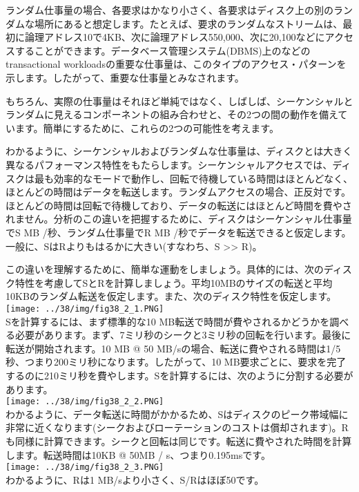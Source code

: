 ランダム仕事量の場合、各要求はかなり小さく、各要求はディスク上の別のランダムな場所にあると想定します。たとえば、要求のランダムなストリームは、最初に論理アドレス10で4KB、次に論理アドレス550,000、次に20,100などにアクセスすることができます。データベース管理システム(DBMS)上のなどのtransactional
workloadsの重要な仕事量は、このタイプのアクセス・パターンを示します。したがって、重要な仕事量とみなされます。

もちろん、実際の仕事量はそれほど単純ではなく、しばしば、シーケンシャルとランダムに見えるコンポーネントの組み合わせと、その2つの間の動作を備えています。簡単にするために、これらの2つの可能性を考えます。

わかるように、シーケンシャルおよびランダムな仕事量は、ディスクとは大きく異なるパフォーマンス特性をもたらします。シーケンシャルアクセスでは、ディスクは最も効率的なモードで動作し、回転で待機している時間はほとんどなく、ほとんどの時間はデータを転送します。ランダムアクセスの場合、正反対です。ほとんどの時間は回転で待機しており、データの転送にはほとんど時間を費やされません。分析のこの違いを把握するために、ディスクはシーケンシャル仕事量でS
MB /秒、ランダム仕事量でR MB
/秒でデータを転送できると仮定します。一般に、SはRよりもはるかに大きい(すなわち、S
\textgreater\textgreater{} R)。

この違いを理解するために、簡単な運動をしましょう。具体的には、次のディスク特性を考慮してSとRを計算しましょう。平均10MBのサイズの転送と平均10KBのランダム転送を仮定します。また、次のディスク特性を仮定します。\\
\texttt{[image: ../38/img/fig38\_2\_1.PNG]}\\
Sを計算するには、まず標準的な10
MB転送で時間が費やされるかどうかを調べる必要があります。まず、7ミリ秒のシークと3ミリ秒の回転を行います。最後に転送が開始されます。10
MB @ 50
MB/sの場合、転送に費やされる時間は1/5秒、つまり200ミリ秒になります。したがって、10
MB要求ごとに、要求を完了するのに210ミリ秒を費やします。Sを計算するには、次のように分割する必要があります。\\
\texttt{[image: ../38/img/fig38\_2\_2.PNG]}\\
わかるように、データ転送に時間がかかるため、Sはディスクのピーク帯域幅に非常に近くなります(シークおよびローテーションのコストは償却されます)。Rも同様に計算できます。シークと回転は同じです。転送に費やされた時間を計算します。転送時間は10KB
@ 50MB / s、つまり0.195msです。\\
\texttt{[image: ../38/img/fig38\_2\_3.PNG]}\\
わかるように、Rは1 MB/sより小さく、S/Rはほぼ50です。

